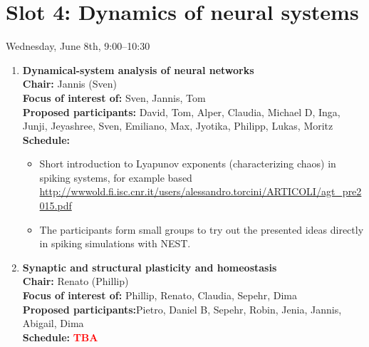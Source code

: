 \documentclass[10pt, a4paper,twoside,american]{article}
\newcommand{\alert}[1]{\textcolor{red}{\bf #1}}
\begin{document}
\section*{Slot 4: Dynamics of neural systems}
Wednesday, June 8th, 9:00--10:30

\begin{enumerate}[resume]
\item {\large\bf Dynamical-system analysis of neural networks}\\[1ex]
  {\bf Chair:} Jannis (Sven)\\[1ex]
  {\bf Focus of interest of:} Sven, Jannis,  Tom\\[1ex]
  {\bf Proposed participants:} David, Tom, Alper, Claudia, Michael D, Inga, Junji, Jeyashree, Sven, Emiliano, Max, Jyotika, Philipp, Lukas, Moritz\\[1ex]
  {\bf Schedule:}
  \begin{itemize}
  \item Short introduction to Lyapunov exponents (characterizing
    chaos) in spiking systems, for example based \url{http://wwwold.fi.isc.cnr.it/users/alessandro.torcini/ARTICOLI/agt_pre2015.pdf}
  \item The participants form small groups to try out the presented
    ideas directly in spiking simulations with NEST.
  \end{itemize}
\item {\large\bf Synaptic and structural plasticity and homeostasis}\\[1ex]
  {\bf Chair:} Renato (Phillip)\\[1ex]
  {\bf Focus of interest of:} Phillip, Renato, Claudia, Sepehr, Dima\\[1ex]
  {\bf Proposed participants:}Pietro, Daniel B, Sepehr, Robin, Jenia, Jannis, Abigail, Dima\\[1ex]
  {\bf Schedule:} \alert{TBA}\\[1ex]

\end{enumerate}
\end{document}
